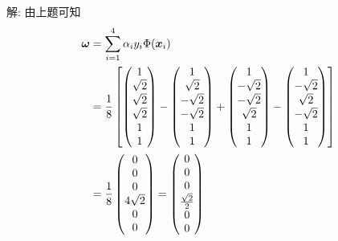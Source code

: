 \documentclass{article}
\begin{document}
解: 由上题可知
\begin{equation}
  \begin{aligned}
    \bm{\omega}
    &=\sum_{i=1}^4\alpha_iy_i\Phi(\bm{x}_i)\\
    &=\frac{1}{8}
    \left[
      \begin{pmatrix}
        1 \\ \sqrt{2} \\ \sqrt{2} \\ \sqrt{2} \\ 1 \\ 1 \\
      \end{pmatrix}
      -\begin{pmatrix}
        1 \\ \sqrt{2} \\ -\sqrt{2} \\ -\sqrt{2} \\ 1 \\ 1 \\
      \end{pmatrix}
      +\begin{pmatrix}
        1 \\ -\sqrt{2} \\ -\sqrt{2} \\ \sqrt{2} \\ 1 \\ 1 \\
      \end{pmatrix}
      -\begin{pmatrix}
        1 \\ -\sqrt{2} \\ \sqrt{2} \\ -\sqrt{2} \\ 1 \\ 1 \\
      \end{pmatrix}
    \right]\\
    &=\frac{1}{8}
      \begin{pmatrix}
        0 \\ 0 \\ 0 \\ 4\sqrt{2} \\ 0 \\ 0 \\
      \end{pmatrix}
    =\begin{pmatrix}
      0 \\ 0 \\ 0 \\ \frac{\sqrt{2}}{2} \\ 0 \\ 0 \\
    \end{pmatrix}
  \end{aligned}
\end{equation}
\end{document}
